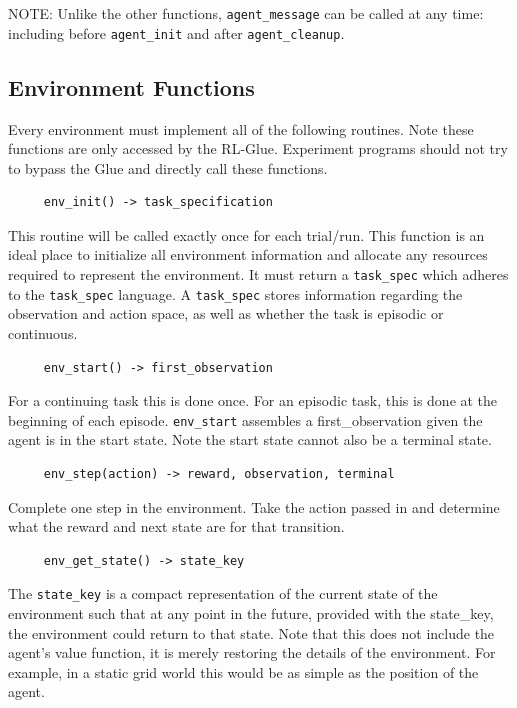 \documentclass[11pt]{article}
\begin{document}
NOTE: Unlike the other functions, \texttt{agent\_message} can be called at any time: including before \texttt{agent\_init} and after \texttt{agent\_cleanup}.
                          
\subsection{Environment Functions}
\label{Eref}
Every environment must implement all of the following routines. Note these functions are only accessed by the RL-Glue. Experiment programs should not try to bypass the Glue and directly call these functions.
\begin{verbatim}
     env_init() -> task_specification
\end{verbatim}
This routine will be called exactly once for each trial/run. This function is an ideal place to initialize all environment information and allocate any resources required to represent the environment. It must return a \texttt{task\_spec} which adheres to the \texttt{task\_spec} language. A \texttt{task\_spec} stores information regarding the observation and action space, as well as whether the task is episodic or continuous.

\begin{verbatim}
     env_start() -> first_observation\end{verbatim}
For a continuing task this is done once. For an episodic task, this is done at the beginning of each episode. \texttt{env\_start} assembles a first\_observation given the agent is in the start state. Note the start state cannot also be a terminal state.

\begin{verbatim}
     env_step(action) -> reward, observation, terminal\end{verbatim}
Complete one step in the environment. Take the action passed in and determine what the reward and next state are for that transition.

\begin{verbatim}
     env_get_state() -> state_key
\end{verbatim}
The \texttt{state\_key} is a compact representation of the current state of the environment such that at any point in the future, provided with the state\_key, the environment could return to that state. Note that this does not include the agent's value function, it is merely restoring the details of the environment. For example, in a static grid world this would be as simple as the position of the agent.
\end{document}
